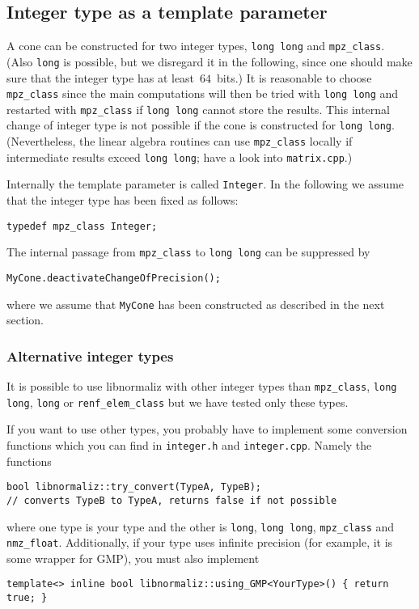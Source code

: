\begin{small}
\subsection{Integer type as a template parameter}

A cone can be constructed for two integer types, \verb|long long| and \verb|mpz_class|. (Also \verb|long| is possible, but we disregard it in the following, since one should make sure that the integer type has at least~$64$~bits.) It is reasonable to choose \verb|mpz_class| since the main computations will then be tried with \verb|long long| and restarted with \verb|mpz_class| if \verb|long long| cannot store the results. This internal change of integer type is not possible if the cone is constructed for \verb|long long|. (Nevertheless, the linear algebra routines can use \verb|mpz_class| locally if intermediate results exceed \verb|long long|; have a look into \verb|matrix.cpp|.)

Internally the template parameter is called \verb|Integer|. In the following we assume that the integer type has been fixed as follows:
\begin{Verbatim}
typedef mpz_class Integer;
\end{Verbatim}

The internal passage from \verb|mpz_class| to \verb|long long| can be suppressed by
\begin{Verbatim}
MyCone.deactivateChangeOfPrecision();
\end{Verbatim}
where we assume that \verb|MyCone| has been constructed as described in the next section.

\subsubsection{Alternative integer types}

It is possible to use libnormaliz with other integer types than \verb|mpz_class|, \verb|long long|, \verb|long| or \verb|renf_elem_class| but we have tested only these types.

If you want to use other types, you probably have to implement some conversion functions which you can find in \verb|integer.h| and \verb|integer.cpp|. Namely the functions
\begin{Verbatim}
bool libnormaliz::try_convert(TypeA, TypeB); 
// converts TypeB to TypeA, returns false if not possible
\end{Verbatim}
where one type is your type and the other is \verb|long|, \verb|long long|, \verb|mpz_class| and \verb|nmz_float|.
Additionally, if your type uses infinite precision (for example, it is some wrapper for GMP), you must also implement
\begin{Verbatim}
template<> inline bool libnormaliz::using_GMP<YourType>() { return true; }
\end{Verbatim}


\end{small}
